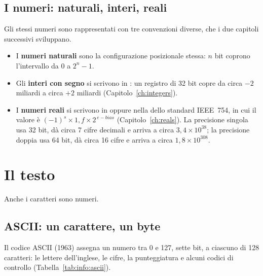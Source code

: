 \subsection{I numeri: naturali, interi, reali}

Gli stessi numeri sono rappresentati con tre convenzioni diverse, che i due
capitoli successivi sviluppano.

\begin{itemize}
\item I \textbf{numeri naturali} sono la configurazione posizionale stessa:
  $n$ bit coprono l'intervallo da 0 a $2^{n}-1$.
\item Gli \textbf{interi con segno} si scrivono in : un
  registro di 32 bit copre da circa $-2$ miliardi a circa $+2$ miliardi
  (Capitolo~\ref{ch:integers}).
\item I \textbf{numeri reali} si scrivono in  oppure nella
   dello standard IEEE~754, in cui il valore è
  $(-1)^{s}\times 1,f\times 2^{\,e-\mathit{bias}}$
  (Capitolo~\ref{ch:reals}). La precisione singola usa 32 bit, dà circa 7 cifre
  decimali e arriva a circa $3,4\times 10^{38}$; la precisione doppia usa 64
  bit, dà circa 16 cifre e arriva a circa $1,8\times 10^{308}$.
\end{itemize}

\section{Il testo}

Anche i caratteri sono numeri.

\subsection{ASCII: un carattere, un byte}

Il codice ASCII (1963) assegna un numero tra 0 e 127, sette bit, a ciascuno di
128 caratteri: le lettere dell'inglese, le cifre, la punteggiatura e alcuni
codici di controllo (Tabella~\ref{tab:info:ascii}).

